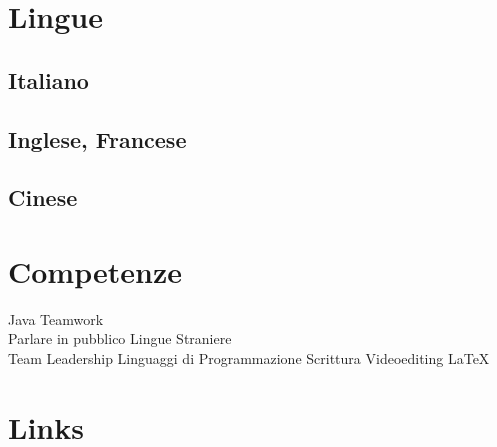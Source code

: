 \documentclass[a4paper]{deedy-resume} %
\begin{document}
\begin{minipage}[t]{0.33\textwidth}

\sectionspace %


\section{Lingue}

\subsection{Italiano}

\subsection{Inglese, Francese}


\subsection{Cinese}

\sectionspace %


\section{Competenze}

Java \textbullet{} Teamwork \textbullet{} \\Parlare in pubblico \textbullet{} Lingue Straniere\textbullet{}\\
Team Leadership\textbullet{} Linguaggi di Programmazione \textbullet{} Scrittura \textbullet{} Videoediting \textbullet{} \LaTeX\ \\ 

\sectionspace %


\section{Links} 


\end{minipage}
\end{document}
